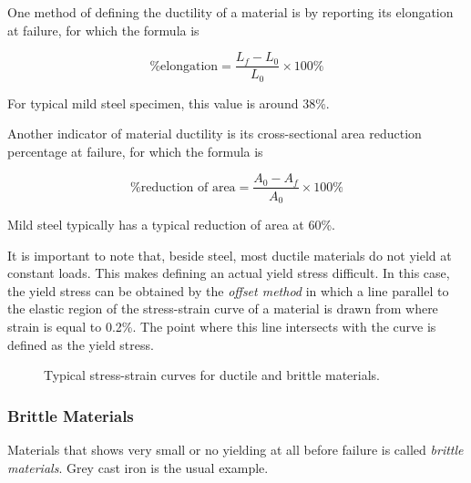 \documentclass[
10pt,
a4paper,
openany,
svgnames,
]{book} %
\begin{document}
One method of defining the ductility of a material is by reporting its elongation at failure, for which the formula is

\begin{equation}
  \text{\% elongation} = \frac{L_f - L_0}{L_0} \times 100\%
\end{equation}

For typical mild steel specimen, this value is around 38\%.

Another indicator of material ductility is its cross-sectional area reduction percentage at failure, for which the formula is

\begin{equation}
  \text{\% reduction of area} = \frac{A_0 - A_f}{A_0} \times 100\%
\end{equation}

Mild steel typically has a typical reduction of area at 60\%.

It is important to note that, beside steel, most ductile materials do not yield at constant loads. This makes defining an actual yield stress difficult. In this case, the yield stress can be obtained by the \emph{offset method} in which a line parallel to the elastic region of the stress-strain curve of a material is drawn from where strain is equal to 0.2\%. The point where this line intersects with the curve is defined as the yield stress.

\begin{figure}[h]
  \centering
  \caption{Typical stress-strain curves for ductile and brittle materials.}
\end{figure}

\subsubsection{Brittle Materials}

Materials that shows very small or no yielding at all before failure is called \emph{brittle materials}. Grey cast iron is the usual example.
\end{document}

